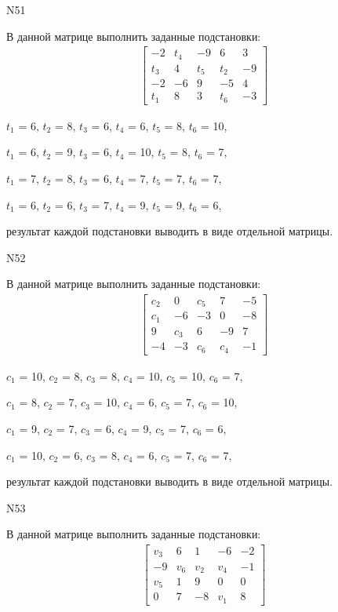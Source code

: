 \documentclass[11pt]{report}
\begin{document}
N51

В данной матрице выполнить заданные подстановки:
\begin{align*}
\left[\begin{matrix}-2 & t_{4} & -9 & 6 & 3\\t_{3} & 4 & t_{5} & t_{2} & -9\\-2 & -6 & 9 & -5 & 4\\t_{1} & 8 & 3 & t_{6} & -3\end{matrix}\right]
\end{align*}


$t_{1}$ = 6, $t_{2}$ = 8, $t_{3}$ = 6, $t_{4}$ = 6, $t_{5}$ = 8, $t_{6}$ = 10, 

$t_{1}$ = 6, $t_{2}$ = 9, $t_{3}$ = 6, $t_{4}$ = 10, $t_{5}$ = 8, $t_{6}$ = 7, 

$t_{1}$ = 7, $t_{2}$ = 8, $t_{3}$ = 6, $t_{4}$ = 7, $t_{5}$ = 7, $t_{6}$ = 7, 

$t_{1}$ = 6, $t_{2}$ = 6, $t_{3}$ = 7, $t_{4}$ = 9, $t_{5}$ = 9, $t_{6}$ = 6, 

результат каждой подстановки выводить в виде отдельной матрицы.

N52

В данной матрице выполнить заданные подстановки:
\begin{align*}
\left[\begin{matrix}c_{2} & 0 & c_{5} & 7 & -5\\c_{1} & -6 & -3 & 0 & -8\\9 & c_{3} & 6 & -9 & 7\\-4 & -3 & c_{6} & c_{4} & -1\end{matrix}\right]
\end{align*}


$c_{1}$ = 10, $c_{2}$ = 8, $c_{3}$ = 8, $c_{4}$ = 10, $c_{5}$ = 10, $c_{6}$ = 7, 

$c_{1}$ = 8, $c_{2}$ = 7, $c_{3}$ = 10, $c_{4}$ = 6, $c_{5}$ = 7, $c_{6}$ = 10, 

$c_{1}$ = 9, $c_{2}$ = 7, $c_{3}$ = 6, $c_{4}$ = 9, $c_{5}$ = 7, $c_{6}$ = 6, 

$c_{1}$ = 10, $c_{2}$ = 6, $c_{3}$ = 8, $c_{4}$ = 6, $c_{5}$ = 7, $c_{6}$ = 7, 

результат каждой подстановки выводить в виде отдельной матрицы.

N53

В данной матрице выполнить заданные подстановки:
\begin{align*}
\left[\begin{matrix}v_{3} & 6 & 1 & -6 & -2\\-9 & v_{6} & v_{2} & v_{4} & -1\\v_{5} & 1 & 9 & 0 & 0\\0 & 7 & -8 & v_{1} & 8\end{matrix}\right]
\end{align*}
\end{document}
